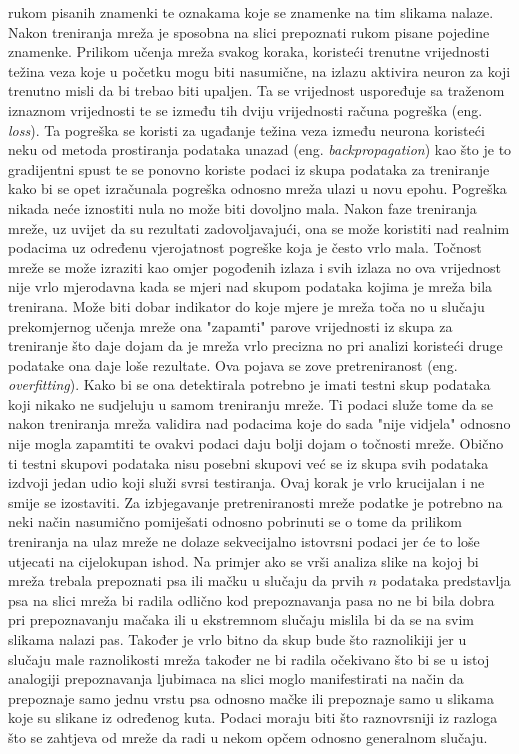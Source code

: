 \documentclass[times, utf8, diplomski]{fer}
\begin{document}
rukom pisanih znamenki te oznakama koje se znamenke na tim slikama nalaze. Nakon treniranja mreža je sposobna
na slici prepoznati rukom pisane pojedine znamenke. Prilikom učenja mreža svakog koraka, koristeći trenutne
vrijednosti težina veza koje u početku mogu biti nasumične, na izlazu aktivira neuron za koji trenutno misli
da bi trebao biti upaljen. Ta se vrijednost uspoređuje sa traženom iznaznom vrijednosti te se između tih dviju
vrijednosti računa pogreška (eng. \textit{loss}). Ta pogreška se koristi za ugađanje težina veza između neurona
koristeći neku od metoda prostiranja podataka unazad (eng. \textit{backpropagation}) kao što je to gradijentni
spust te se ponovno koriste podaci iz skupa podataka za treniranje kako bi se opet izračunala pogreška
odnosno mreža ulazi u novu epohu.
Pogreška nikada neće iznostiti nula no može biti dovoljno mala. Nakon faze treniranja mreže, uz uvijet da su
rezultati zadovoljavajući, ona se može koristiti nad realnim podacima uz određenu vjerojatnost pogreške koja
je često vrlo mala. Točnost mreže se može izraziti kao omjer pogođenih izlaza i svih izlaza no ova vrijednost
nije vrlo mjerodavna kada se mjeri nad skupom podataka kojima je mreža bila trenirana. Može biti dobar indikator
do koje mjere je mreža toča no u slučaju prekomjernog učenja mreže ona "zapamti" parove vrijednosti iz skupa
za treniranje što daje dojam da je mreža vrlo precizna no pri analizi koristeći druge podatake ona daje loše rezultate.
Ova pojava se zove pretreniranost (eng. \textit{overfitting}). Kako bi se ona detektirala potrebno je imati
testni skup podataka koji nikako ne sudjeluju u samom treniranju mreže. Ti podaci služe tome da se nakon treniranja
mreža validira nad podacima koje do sada "nije vidjela" odnosno nije mogla zapamtiti
te ovakvi podaci daju bolji dojam o točnosti mreže. Obično ti testni skupovi podataka nisu posebni skupovi već
se iz skupa svih podataka izdvoji jedan udio koji služi svrsi testiranja. Ovaj korak je vrlo krucijalan i
ne smije se izostaviti. Za izbjegavanje pretreniranosti mreže podatke je potrebno na neki način nasumično
pomiješati odnosno pobrinuti se o tome da prilikom treniranja na ulaz mreže ne dolaze sekvecijalno istovrsni
podaci jer će to loše utjecati na cijelokupan ishod. Na primjer ako se vrši analiza slike na kojoj bi mreža
trebala prepoznati psa ili mačku u slučaju da prvih $n$ podataka predstavlja psa na slici mreža bi radila odlično
kod prepoznavanja pasa no ne bi bila dobra pri prepoznavanju mačaka ili u ekstremnom slučaju mislila bi da se
na svim slikama nalazi pas. Također je vrlo bitno da skup bude što raznolikiji jer u slučaju male raznolikosti
mreža također ne bi radila očekivano što bi se u istoj analogiji prepoznavanja ljubimaca na slici moglo
manifestirati na način da prepoznaje samo jednu vrstu psa odnosno mačke ili prepoznaje samo u slikama koje su
slikane iz određenog kuta. Podaci moraju biti što raznovrsniji iz razloga što se zahtjeva od mreže da radi u
nekom opčem odnosno generalnom slučaju.
\end{document}
